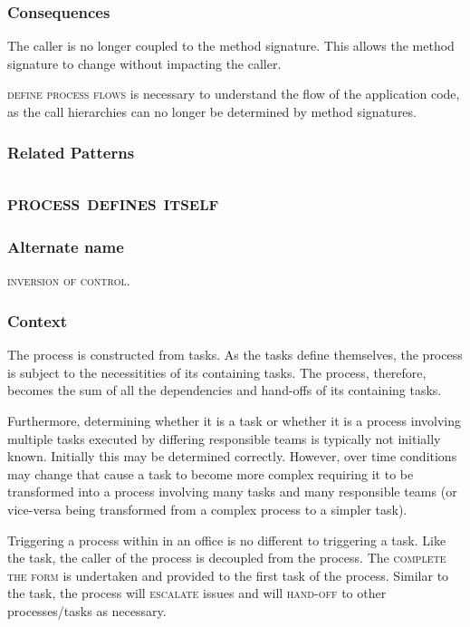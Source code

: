 \documentclass[prodmode]{style/acmlarge}
\begin{document}
\subsubsection*{Consequences} The caller is no longer coupled to the method
signature.  This allows the method signature to change without impacting the
caller.

\textsc{define process flows} is necessary to understand the flow of the
application code, as the call hierarchies can no longer be determined by method
signatures.

\subsubsection*{Related Patterns}



\subsection{\textsc{\textbf{process defines itself}}}

\subsubsection*{Alternate name} \textsc{inversion of control}.

\subsubsection*{Context} The process is constructed from tasks.  As the tasks
define themselves, the process is subject to the necessitities of its containing
tasks.  The process, therefore, becomes the sum of all the dependencies and
hand-offs of its containing tasks.

Furthermore, determining whether it is a task or whether it is a process involving
multiple tasks executed by differing responsible teams is typically not
initially known.  Initially this may be determined correctly.  However, over
time conditions may change that cause a task to become more complex requiring
it to be transformed into a process involving many tasks and many responsible
teams (or vice-versa being transformed from a complex process to a simpler task).

Triggering a process within in an office is no different to triggering a task.
Like the task, the caller of the process is decoupled from the process.  The
\textsc{complete the form} is undertaken and provided to the first task of the
process.  Similar to the task, the process will \textsc{escalate} issues and
will \textsc{hand-off} to other processes/tasks as necessary.
\end{document}
